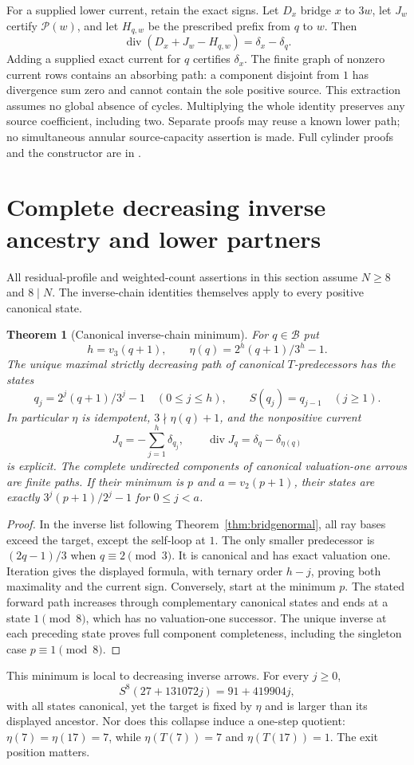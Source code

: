 \documentclass[11pt]{article}
\newtheorem{theorem}{Theorem}
\begin{document}
For a supplied lower current, retain the exact signs. Let $D_x$ bridge
$x$ to $3w$, let $J_w$ certify $\mathcal P(w)$, and let $H_{q,w}$
be the prescribed prefix from $q$ to $w$. Then
\[
\operatorname{div}(D_x+J_w-H_{q,w})=\delta_x-\delta_q.
\]
Adding a supplied exact current for $q$ certifies $\delta_x$.
The finite graph of nonzero current rows contains an absorbing path:
a component disjoint from $1$ has divergence sum zero and cannot
contain the sole positive source. This extraction assumes no global
absence of cycles. Multiplying the whole identity preserves any source
coefficient, including two. Separate proofs may reuse a known lower path;
no simultaneous annular source-capacity assertion is made.
Full cylinder proofs and the constructor are in
.

\section{Complete decreasing inverse ancestry and lower partners}
All residual-profile and weighted-count assertions in this section
assume $N\ge8$ and $8\mid N$. The inverse-chain identities themselves
apply to every positive canonical state.
\begin{theorem}[Canonical inverse-chain minimum]\label{thm:inverseancestry}
For $q\in\mathcal B$ put
\[
h=v_3(q+1),\qquad \eta(q)=2^h(q+1)/3^h-1.
\]
The unique maximal strictly decreasing path of canonical
$T$-predecessors has the states
\[
q_j=2^j(q+1)/3^j-1\quad(0\le j\le h),\qquad
S(q_j)=q_{j-1}\quad(j\ge1).
\]
In particular $\eta$ is idempotent, $3\nmid\eta(q)+1$, and the
nonpositive current
\[
J_q=-\sum_{j=1}^h\delta_{q_j},\qquad
\operatorname{div}J_q=\delta_q-\delta_{\eta(q)}
\]
is explicit. The complete undirected components of canonical
valuation-one arrows are finite paths. If their minimum is $p$ and
$a=v_2(p+1)$, their states are exactly
$3^j(p+1)/2^j-1$ for $0\le j<a$.
\end{theorem}
\begin{proof}
In the inverse list following Theorem~\ref{thm:bridgenormal}, all
ray bases exceed the target, except the self-loop at $1$. The only
smaller predecessor is $(2q-1)/3$ when $q\equiv2\pmod3$.
It is canonical and has exact valuation one. Iteration gives the
displayed formula, with ternary order $h-j$, proving both maximality
and the current sign. Conversely, start at the minimum $p$.
The stated forward path increases through complementary canonical
states and ends at a state $1\pmod8$, which has no valuation-one
successor. The unique inverse at each preceding state proves full
component completeness, including the singleton case $p\equiv1\pmod8$.
\end{proof}
This minimum is local to decreasing inverse arrows. For every $j\ge0$,
\[
S^8(27+131072j)=91+419904j,
\]
with all states canonical, yet the target is fixed by $\eta$ and is
larger than its displayed ancestor. Nor does this collapse induce a
one-step quotient: $\eta(7)=\eta(17)=7$, while
$\eta(T(7))=7$ and $\eta(T(17))=1$. The exit position matters.
\end{document}
